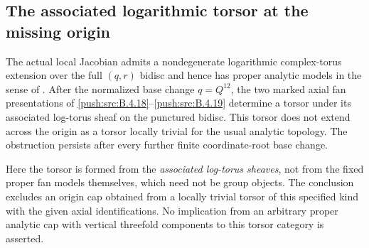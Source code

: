 \subsection{The associated logarithmic torsor at the missing origin}

\begin{proposition}\label{push:src:B.4.24}
\label{push:B424}
The actual local Jacobian admits a nondegenerate logarithmic
complex-torus extension over the full $(q,r)$ bidisc and hence
has proper analytic models in the sense of
\citet{KKN2008Root}. After the normalized base change
$q=Q^{12}$, the two marked axial fan presentations of
\ref{push:src:B.4.18}--\ref{push:src:B.4.19} determine a torsor under its associated
log-torus sheaf on the punctured bidisc. This torsor does
not extend across the origin as a torsor locally trivial
for the usual analytic topology. The obstruction persists
after every further finite coordinate-root base change.

Here the torsor is formed from the \emph{associated
log-torus sheaves}, not from the fixed proper fan models
themselves, which need not be group objects. The conclusion
excludes an origin cap obtained from a locally trivial
torsor of this specified kind with the given axial
identifications. No implication from an arbitrary proper
analytic cap with vertical threefold components to this
torsor category is asserted.
\end{proposition}


